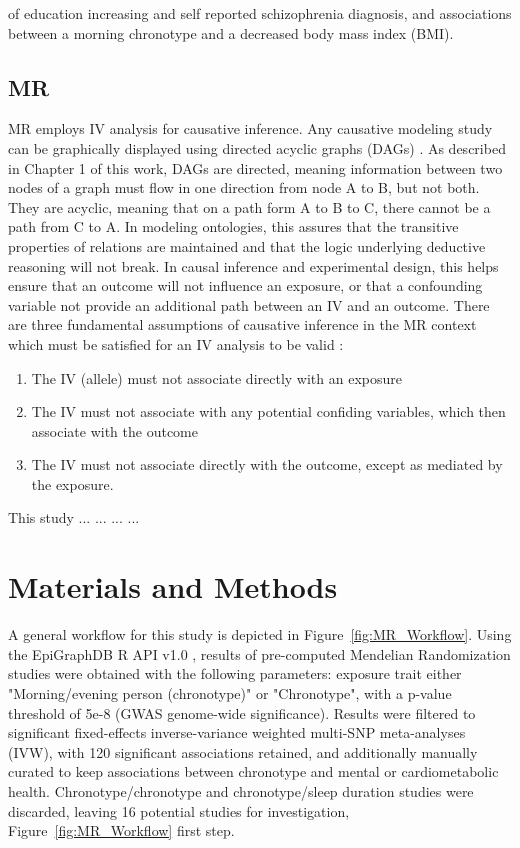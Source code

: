 \documentclass[journal,article,submit,moreauthors,pdftex]{Definitions/mdpi}
\begin{document}
of education increasing and self reported schizophrenia diagnosis, and associations between a morning chronotype and a decreased body mass index (BMI). 

\subsection{MR}
MR employs IV analysis for causative inference. Any causative modeling study can be graphically displayed using directed acyclic graphs (DAGs) \cite{pearl_causal_nodate}. As described in Chapter 1 of this work, DAGs are directed, meaning information between two nodes of a graph must flow in one direction from node A to B, but not both. They are acyclic, meaning that on a path form A to B to C, there cannot be a path from C to A. In modeling ontologies, this assures that the transitive properties of relations are maintained and that the logic underlying deductive reasoning will not break. In causal inference and experimental design, this helps ensure that an outcome will not influence an exposure, or that a confounding variable not provide an additional path between an IV and an outcome. There are three fundamental assumptions of causative inference in the MR context which must be satisfied for an IV analysis to be valid \cite{burgess_guidelines_2020}:
\begin{enumerate}
  \item The IV (allele) must not associate directly with an exposure
  \item The IV must not associate with any potential confiding variables, which then associate with the outcome
  \item The IV must not associate directly with the outcome, except as mediated by the exposure.
\end{enumerate}

This study ... ... ... ... 

\section{Materials and Methods}

A general workflow for this study is depicted in Figure~\ref{fig:MR_Workflow}. Using the EpiGraphDB R API v1.0 \cite{liu_epigraphdb_2020}, results of pre-computed Mendelian Randomization studies were obtained with the following parameters: exposure trait either "Morning/evening person (chronotype)" or "Chronotype", with a p-value threshold of 5e-8 (GWAS genome-wide significance). Results were filtered to significant fixed-effects inverse-variance weighted multi-SNP meta-analyses (IVW), with 120 significant associations retained, and additionally manually curated to keep associations between chronotype and mental or cardiometabolic health. Chronotype/chronotype and chronotype/sleep duration studies were discarded, leaving 16 potential studies for investigation,  Figure~\ref{fig:MR_Workflow} first step.
\end{document}
